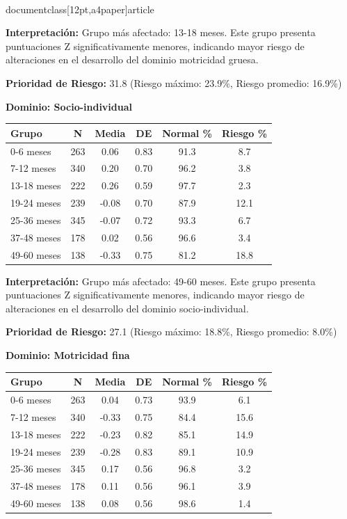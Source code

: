 \\documentclass[12pt,a4paper]{article}
\begin{document}
\textbf{Interpretación:} Grupo más afectado: 13-18 meses. Este grupo presenta puntuaciones Z significativamente menores, indicando mayor riesgo de alteraciones en el desarrollo del dominio motricidad gruesa.

\textbf{Prioridad de Riesgo:} 31.8 (Riesgo máximo: 23.9\%, Riesgo promedio: 16.9\%)


\vspace{0.5cm}


\textbf{Dominio: Socio-individual}


\begin{center}
\begin{tabular}{|l|c|c|c|c|c|}
\hline
\textbf{Grupo} & \textbf{N} & \textbf{Media} & \textbf{DE} & \textbf{Normal \%} & \textbf{Riesgo \%} \\
\hline
0-6 meses & 263 & 0.06 & 0.83 & 91.3 & 8.7 \\
7-12 meses & 340 & 0.20 & 0.70 & 96.2 & 3.8 \\
13-18 meses & 222 & 0.26 & 0.59 & 97.7 & 2.3 \\
19-24 meses & 239 & -0.08 & 0.70 & 87.9 & 12.1 \\
25-36 meses & 345 & -0.07 & 0.72 & 93.3 & 6.7 \\
37-48 meses & 178 & 0.02 & 0.56 & 96.6 & 3.4 \\
49-60 meses & 138 & -0.33 & 0.75 & 81.2 & 18.8 \\

\hline
\end{tabular}
\end{center}


\textbf{Interpretación:} Grupo más afectado: 49-60 meses. Este grupo presenta puntuaciones Z significativamente menores, indicando mayor riesgo de alteraciones en el desarrollo del dominio socio-individual.

\textbf{Prioridad de Riesgo:} 27.1 (Riesgo máximo: 18.8\%, Riesgo promedio: 8.0\%)


\vspace{0.5cm}


\textbf{Dominio: Motricidad fina}


\begin{center}
\begin{tabular}{|l|c|c|c|c|c|}
\hline
\textbf{Grupo} & \textbf{N} & \textbf{Media} & \textbf{DE} & \textbf{Normal \%} & \textbf{Riesgo \%} \\
\hline
0-6 meses & 263 & 0.04 & 0.73 & 93.9 & 6.1 \\
7-12 meses & 340 & -0.33 & 0.75 & 84.4 & 15.6 \\
13-18 meses & 222 & -0.23 & 0.82 & 85.1 & 14.9 \\
19-24 meses & 239 & -0.28 & 0.83 & 89.1 & 10.9 \\
25-36 meses & 345 & 0.17 & 0.56 & 96.8 & 3.2 \\
37-48 meses & 178 & 0.11 & 0.56 & 96.1 & 3.9 \\
49-60 meses & 138 & 0.08 & 0.56 & 98.6 & 1.4 \\

\hline
\end{tabular}
\end{center}
\end{document}
